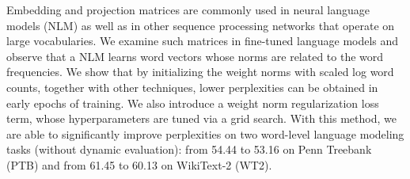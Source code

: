 Embedding and projection matrices are commonly used in neural language models (NLM) as well as in other sequence processing networks that operate on large vocabularies. We examine such matrices in fine-tuned language models and observe that a NLM learns word vectors whose norms are related to the word frequencies. We show that by initializing the weight norms with scaled log word counts, together with other techniques, lower perplexities can be obtained in early epochs of training. We also introduce a weight norm regularization loss term, whose hyperparameters are tuned via a grid search. With this method, we are able to significantly improve perplexities on two word-level language modeling tasks (without dynamic evaluation): from 54.44 to 53.16 on Penn Treebank (PTB) and from 61.45 to 60.13 on WikiText-2 (WT2).
